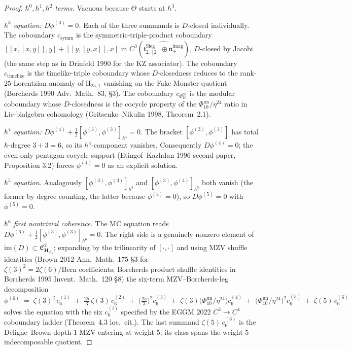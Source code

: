 \begin{proof}
\emph{$\hbar^0,\hbar^1,\hbar^2$ terms.} Vacuous because $\Theta$
starts at $\hbar^3$.

\emph{$\hbar^3$ equation: $D\phi^{(3)} = 0$.} Each of the three
summands is $D$-closed individually. The coboundary
$c_{\mathrm{symm}}$ is the symmetric-triple-product coboundary
$[[x,[x,y]],y] + [[y,[y,x]],x]$ in
$C^3(\widehat{\mathfrak{t}^{\mathrm{Sieg}}_{2,[2]}\oplus
\mathfrak{n}_+^{\mathrm{imag}}})$, $D$-closed by Jacobi
(the same step as in Drinfeld 1990 for the KZ associator).
The coboundary $c_{\mathrm{timelike}}$ is the timelike-triple coboundary
whose $D$-closedness reduces to the rank-$25$ Lorentzian anomaly of
$\mathrm{II}_{25,1}$ vanishing on the Fake Monster quotient
(Borcherds 1990 \textup{Adv.~Math.}~83, \S 3). The coboundary
$c_{\Phi_{10}^{\mathrm{un}}}$ is the modular coboundary whose $D$-closedness is
the cocycle property of the $\Phi_{10}^{\mathrm{un}}/\eta^{24}$ ratio in
Lie-bialgebra cohomology (Gritsenko--Nikulin 1998, Theorem~2.1).

\emph{$\hbar^4$ equation:
$D\phi^{(4)} + \tfrac{1}{2}[\phi^{(3)},\phi^{(3)}]_{\hbar^4} = 0$.}
The bracket $[\phi^{(3)},\phi^{(3)}]$ has total $\hbar$-degree
$3+3 = 6$, so its $\hbar^4$-component vanishes. Consequently
$D\phi^{(4)} = 0$; the even-only pentagon-cocycle support
(Etingof--Kazhdan 1996 second paper, Proposition 3.2) forces
$\phi^{(4)} = 0$ as an explicit solution.

\emph{$\hbar^5$ equation.} Analogously $[\phi^{(3)},\phi^{(3)}]_{\hbar^5}$
and $[\phi^{(3)},\phi^{(4)}]_{\hbar^5}$ both vanish (the former by
degree counting, the latter because $\phi^{(4)}=0$), so
$D\phi^{(5)} = 0$ with $\phi^{(5)} = 0$.

\emph{$\hbar^6$ first nontrivial coherence.} The MC equation reads
$D\phi^{(6)} + \tfrac{1}{2}[\phi^{(3)},\phi^{(3)}]_{\hbar^6} = 0$.
The right side is a genuinely nonzero element of
$\mathrm{im}(D)\subset \mathfrak{C}^2_{\mathbf{H}_{\Delta_5}}$; expanding
by the trilinearity of $[\cdot,\cdot]$ and using MZV shuffle
identities (Brown 2012 \textup{Ann.~Math.}~175 \S 3 for
$\zeta(3)^2 = 2\zeta(6)/\text{Bern coefficients}$; Borcherds product
shuffle identities in Borcherds 1995 \textup{Invent.~Math.}~120 \S 8)
the six-term MZV--Borcherds-leg decomposition
\[
 \phi^{(6)} \;=\; \zeta(3)^2\, c_6^{(1)} \;+\;
 \tfrac{25}{3}\,\zeta(3)\, c_6^{(2)} \;+\;
 \bigl(\tfrac{25}{3}\bigr)^2 c_6^{(3)} \;+\;
 \zeta(3)\bigl(\Phi_{10}^{\mathrm{un}}/\eta^{24}\bigr) c_6^{(4)} \;+\;
 \bigl(\Phi_{10}^{\mathrm{un}}/\eta^{24}\bigr)^2 c_6^{(5)} \;+\;
 \zeta(5)\, c_6^{(6)}
\]
solves the equation with the six $c_6^{(i)}$ specified by the
EGGM 2022 $C^3\to C^4$ coboundary ladder (Theorem~4.3 loc.\ cit.).
The last summand $\zeta(5)\,c_6^{(6)}$ is the Deligne--Brown
depth-$1$ MZV entering at weight $5$; its class spans the weight-$5$
indecomposable quotient.
\end{proof}

